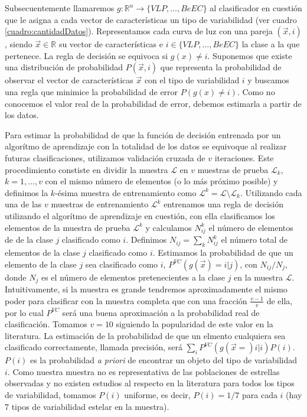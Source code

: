 \documentclass[letterpaper,12pt]{book}
\begin{document}
Subsecuentemente llamaremos $g:\mathbb{R}^{n}\rightarrow \{VLP,\dots, BeEC\}$ al clasificador en cuestión que le asigna a cada vector de características un tipo de variabilidad (ver cuadro \ref{cuadro:cantidadDatos}). Representamos cada curva de luz con una pareja $(\vec{x}, i)$, siendo $\vec{x}\in\mathbb{R}$ su vector de características e $i\in\{VLP,\dots, BeEC\}$ la clase a la que pertenece. La regla de decisión se equivoca si  $g(x)\neq i$. Suponemos que existe una distribución de probabilidad $P(\vec{x},i)$ que representa la probabilidad de observar el vector de características $\vec{x}$ con el tipo de variabilidad $i$ y buscamos una regla que minimice la probabilidad de error $ P(g(x)\neq i)$. Como no conocemos el valor real de la probabilidad de error, debemos estimarla a partir de los datos.

Para estimar la probabilidad de que la función de decisión entrenada por un algorítmo de aprendizaje con la totalidad de los datos se equivoque al realizar futuras clasificaciones, utilizamos validación cruzada de $v$ iteraciones. Este procedimiento constiste en dividir la muestra $\mathcal{L}$ en $v$ muestras de prueba $\mathcal{L}_{k}$, $k=1,\dots,v$ con el mismo número de elementos (o lo más próximo posible) y definimos la $k$-ésima muestra de entrenamiento como $\mathcal{L}^{k} = \mathcal{L}\setminus \mathcal{L}_{k}$. Utilizando cada una de las $v$ muestras de entrenamiento $\mathcal{L}^{k}$  entrenamos una regla de decisión utilizando el algorítmo de aprendizaje en cuestión, con ella clasificamos los elementos de la muestra de prueba $\mathcal{L}^{k}$ y calculamos $N_{ij}^{k}$ el número de elementos de de la clase $j$ clasificado como $i$. Definimos $N_{ij}=\sum_{k}N_{ij}^{k}$ el número total de elementos de la clase $j$ clasificado como $i$. Estimamos la probabilidad de que un elemento de la clase $j$ sea clasificado como $i$, $P^{VC}(g(\vec{x})=i|j)$, con $N_{ij}/N_{j}$, donde $N_{j}$ es el número de elementos pretenecientes a la clase $j$ en la muestra $\mathcal{L}$. Intuitivamente, si la muestra es grande tendremos aproximadamente el mismo poder para clasificar con la muestra completa que con una fracción $\frac{v-1}{v}$ de ella, por lo cual $P^{VC}$ será una buena aproximación a la probabilidad real de clasificación. Tomamos $v=10$ siguiendo la popularidad de este valor en la literatura. La estimación de la probabilidad de que un elmento cualquiera sea clasificado correctamente, llamada precisión,  será $\sum_{i}P^{VC}(g(\vec{x}=)i|i)P(i)$. $P(i)$ es la probabilidad \textit{a priori} de encontrar un objeto del tipo de variabilidad $i$. Como nuestra muestra no es representativa de las poblaciones de estrellas observadas y no existen estudios al respecto en la literatura para todos los tipos de variabilidad, tomamos $P(i)$ uniforme, es decir, $P(i) = 1/7$ para cada $i$ (hay 7 tipos de variabilidad estelar en la muestra).
\end{document}

